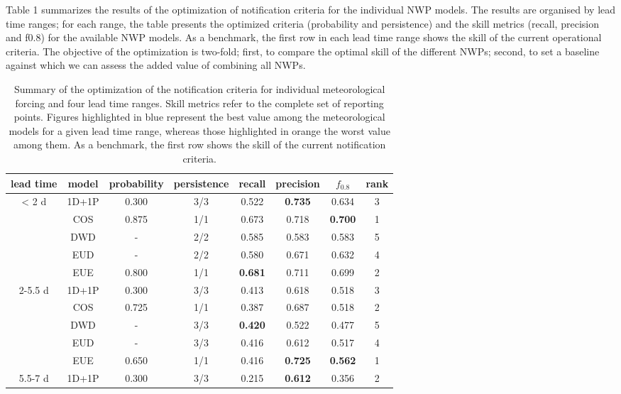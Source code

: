 \documentclass[preprint,12pt]{elsarticle}
\begin{document}
Table 1 summarizes the results of the optimization of notification criteria for the individual NWP models. The results are organised by lead time ranges; for each range, the table presents the optimized criteria (probability and persistence) and the skill metrics (recall, precision and f0.8) for the available NWP models. As a benchmark, the first row in each lead time range shows the skill of the current operational criteria. The objective of the optimization is two-fold; first, to compare the optimal skill of the different NWPs; second, to set a baseline against which we can assess the added value of combining all NWPs.

\begin{table}
    \centering
    \caption{Summary of the optimization of the notification criteria for individual meteorological forcing and four lead time ranges. Skill metrics refer to the complete set of reporting points. Figures highlighted in blue represent the best value among the meteorological models for a given lead time range, whereas those highlighted in orange the worst value among them. As a benchmark, the first row shows the skill of the current notification criteria.}
    \footnotesize
    \begin{tabular}{cccccccc}
        \hline
        lead time & model & probability & persistence & recall & precision & $f_{0.8}$ & rank \\
        \hline
        < 2 d& 1D+1P & 0.300& 3/3 & 0.522 & \textbf{0.735} & 0.634 & 3 \\
         & COS & 0.875 & 1/1 & 0.673 & 0.718 & \textbf{0.700} & 1 \\
         & DWD & - & 2/2 & 0.585 & 0.583 & 0.583 & 5 \\
         & EUD & - & 2/2 & 0.580 & 0.671 & 0.632 & 4 \\
         & EUE & 0.800 & 1/1 & \textbf{0.681} & 0.711 & 0.699 & 2 \\
         \hline
        2-5.5 d& 1D+1P & 0.300& 3/3 & 0.413 & 0.618 & 0.518 & 3 \\
         & COS & 0.725 & 1/1 & 0.387 & 0.687 & 0.518 & 2 \\
         & DWD & - & 3/3 & \textbf{0.420} & 0.522 & 0.477 & 5 \\
         & EUD & - & 3/3 & 0.416 & 0.612 & 0.517 & 4 \\
         & EUE & 0.650 & 1/1 & 0.416 & \textbf{0.725} & \textbf{0.562} & 1 \\
         \hline
        5.5-7 d& 1D+1P & 0.300& 3/3 & 0.215 & \textbf{0.612} & 0.356 & 2 \\

\end{tabular}
\end{table}
\end{document}
